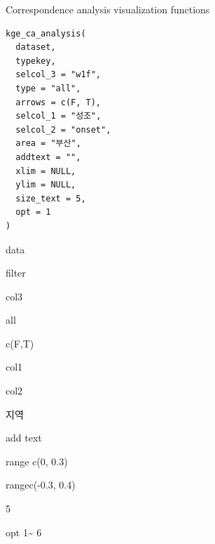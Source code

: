 \documentclass[a4paper]{book}
\begin{document}
%
\begin{Description}
Correspondence analysis visualization functions
\end{Description}
%
\begin{Usage}
\begin{verbatim}
kge_ca_analysis(
  dataset,
  typekey,
  selcol_3 = "w1f",
  type = "all",
  arrows = c(F, T),
  selcol_1 = "성조",
  selcol_2 = "onset",
  area = "부산",
  addtext = "",
  xlim = NULL,
  ylim = NULL,
  size_text = 5,
  opt = 1
)
\end{verbatim}
\end{Usage}
%
\begin{Arguments}
\begin{ldescription}
\item[\code{dataset}] data

\item[\code{typekey}] filter

\item[\code{selcol\_3}] col3

\item[\code{type}] all

\item[\code{arrows}] c(F,T)

\item[\code{selcol\_1}] col1

\item[\code{selcol\_2}] col2

\item[\code{area}] 지역

\item[\code{addtext}] add text

\item[\code{xlim}] range c(0, 0.3)

\item[\code{ylim}] rangec(-0.3, 0.4)

\item[\code{size\_text}] 5

\item[\code{opt}] opt 1\textasciitilde{} 6
\end{ldescription}
\end{Arguments}
\end{document}
